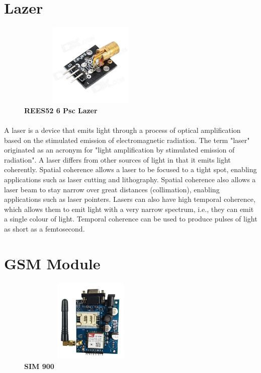 \section{Lazer}
\begin{figure}[H]
 \centering
    \includegraphics[height= 4cm, width=7cm]{project/images/lazer}
  \caption{\textbf{REES52 6 Psc Lazer}}
\end{figure}
\paragraph{}A laser is a device that emits light through a process of optical amplification based on the  stimulated  emission  of  electromagnetic  radiation.  The  term  "laser"  originated  as  an acronym for "light amplification by stimulated emission of radiation".
A laser differs from other sources of light in that it emits light coherently. Spatial coherence allows a laser to be focused to a tight spot, enabling applications such as laser cutting and lithography. Spatial coherence also allows a laser beam to stay narrow over great distances (collimation), enabling applications such as laser pointers. Lasers can also have high temporal coherence, which allows them to emit light with a very narrow spectrum, i.e., they can emit a single colour of light. Temporal coherence can be used to produce pulses of light as short as a femtosecond.


\section{GSM Module}

\begin{figure}[H]
 \centering
    \includegraphics[height= 4cm, width=7cm]{project/images/sim module}
  \caption{\textbf{SIM 900}}
\end{figure}
